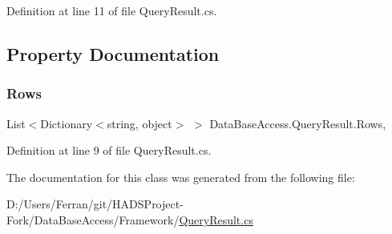 Definition at line 11 of file Query\+Result.\+cs.



\subsection{Property Documentation}
\mbox{\label{classDataBaseAccess_1_1QueryResult_ad6d699c5577f56da79740f1790433565}} 
\subsubsection{\texorpdfstring{Rows}{Rows}}
{\footnotesize\ttfamily List$<$Dictionary$<$string, object$>$ $>$ Data\+Base\+Access.\+Query\+Result.\+Rows\hspace{0.3cm}{\ttfamily [get]}, {}}



Definition at line 9 of file Query\+Result.\+cs.



The documentation for this class was generated from the following file\+:\begin{DoxyCompactItemize}
\item 
D\+:/\+Users/\+Ferran/git/\+H\+A\+D\+S\+Project-\/\+Fork/\+Data\+Base\+Access/\+Framework/\mbox{\hyperlink{QueryResult_8cs}{Query\+Result.\+cs}}\end{DoxyCompactItemize}
